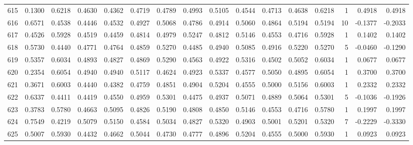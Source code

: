\begin{tabular}{lrrrrrrrrrrrrrrr}
615 &      0.1300 &  0.6218 &  0.4630 &  0.4362 &  0.4719 &  0.4789 &  0.4993 &  0.5105 &  0.4544 &  0.4713 &   0.4638 &     0.6218 &      1 &                    0.4918 &                     0.4918 \\
616 &      0.6571 &  0.4538 &  0.4446 &  0.4532 &  0.4927 &  0.5068 &  0.4786 &  0.4914 &  0.5060 &  0.4864 &   0.5194 &     0.5194 &     10 &                   -0.1377 &                    -0.2033 \\
617 &      0.4526 &  0.5928 &  0.4519 &  0.4459 &  0.4814 &  0.4979 &  0.5247 &  0.4812 &  0.5146 &  0.4553 &   0.4716 &     0.5928 &      1 &                    0.1402 &                     0.1402 \\
618 &      0.5730 &  0.4440 &  0.4771 &  0.4764 &  0.4859 &  0.5270 &  0.4485 &  0.4940 &  0.5085 &  0.4916 &   0.5220 &     0.5270 &      5 &                   -0.0460 &                    -0.1290 \\
619 &      0.5357 &  0.6034 &  0.4893 &  0.4827 &  0.4869 &  0.5290 &  0.4563 &  0.4922 &  0.5316 &  0.4502 &   0.5052 &     0.6034 &      1 &                    0.0677 &                     0.0677 \\
620 &      0.2354 &  0.6054 &  0.4940 &  0.4940 &  0.5117 &  0.4624 &  0.4923 &  0.5337 &  0.4577 &  0.5050 &   0.4895 &     0.6054 &      1 &                    0.3700 &                     0.3700 \\
621 &      0.3671 &  0.6003 &  0.4440 &  0.4382 &  0.4759 &  0.4851 &  0.4904 &  0.5204 &  0.4555 &  0.5000 &   0.5156 &     0.6003 &      1 &                    0.2332 &                     0.2332 \\
622 &      0.6337 &  0.4411 &  0.4419 &  0.4550 &  0.4959 &  0.5301 &  0.4475 &  0.4937 &  0.5071 &  0.4889 &   0.5064 &     0.5301 &      5 &                   -0.1036 &                    -0.1926 \\
623 &      0.3783 &  0.5780 &  0.4663 &  0.5095 &  0.4826 &  0.5190 &  0.4808 &  0.4850 &  0.5146 &  0.4553 &   0.4716 &     0.5780 &      1 &                    0.1997 &                     0.1997 \\
624 &      0.7549 &  0.4219 &  0.5079 &  0.5150 &  0.4584 &  0.5034 &  0.4827 &  0.5320 &  0.4903 &  0.5001 &   0.5201 &     0.5320 &      7 &                   -0.2229 &                    -0.3330 \\
625 &      0.5007 &  0.5930 &  0.4432 &  0.4662 &  0.5044 &  0.4730 &  0.4777 &  0.4896 &  0.5204 &  0.4555 &   0.5000 &     0.5930 &      1 &                    0.0923 &                     0.0923 \\

\end{tabular}
